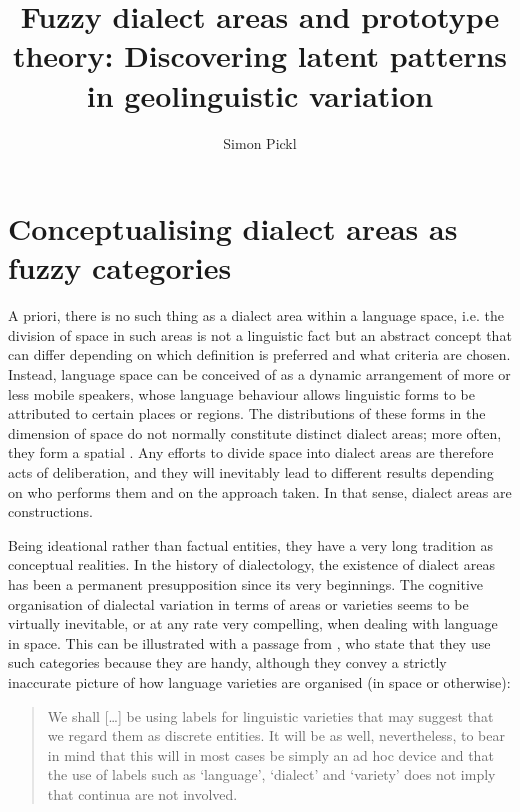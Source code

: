 \documentclass[output=paper]{LSP/langsci}
\author{Simon Pickl\affiliation{University of Salzburg}}
\title{Fuzzy dialect areas and prototype theory: {D}iscovering latent patterns in geolinguistic variation}
\begin{document}
 
 
  
\section{Conceptualising dialect areas as fuzzy categories}

A priori, there is no such thing as a dialect area within a language space, i.e. the division of space in such areas is not a linguistic fact but an abstract concept that can differ depending on which definition is preferred and what criteria are chosen. Instead, language space can be conceived of as a dynamic arrangement of more or less mobile speakers, whose language behaviour allows linguistic forms to be attributed to certain places or regions. The distributions of these forms in the dimension of space do not normally constitute distinct dialect areas; more often, they form a spatial . Any efforts to divide space into dialect areas are therefore acts of deliberation, and they will inevitably lead to different results depending on who performs them and on the approach taken. In that sense, dialect areas are constructions.

Being ideational rather than factual entities, they have a very long tradition as conceptual realities. In the history of dialectology, the existence of dialect areas has been a permanent presupposition since its very beginnings. The cognitive organisation of dialectal variation in terms of areas or varieties seems to be virtually inevitable, or at any rate very compelling, when dealing with language in space. This can be illustrated with a passage from \citet{chambers_dialectology_1998}, who state that they use such categories because they are handy, although they convey a strictly inaccurate picture of how language varieties are organised (in space or otherwise):

\begin{quote}
We shall […] be using labels for linguistic varieties that may suggest that we regard them as discrete entities. It will be as well, nevertheless, to bear in mind that this will in most cases be simply an ad hoc device and that the use of labels such as ‘language’, ‘dialect’ and ‘variety’ does not imply that continua are not involved.\\
\citep[12]{chambers_dialectology_1998}
\end{quote}
\end{document}
